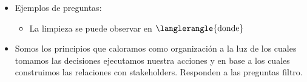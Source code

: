 \begin{enumerate}
\begin{itemize}
            \item Ejemplos de preguntas:
                \begin{itemize}
                    \item La limpieza se puede observar en $\langlerangle{\text{donde}}$ 
                \end{itemize}
            
            \item Somos los principios que caloramos como organización a la luz de los cuales tomamos las decisiones ejecutamos nuestra acciones y en base a los cuales construimos las relaciones con stakeholders. Responden a las preguntas filtro.
        \end{itemize}
\end{enumerate}

